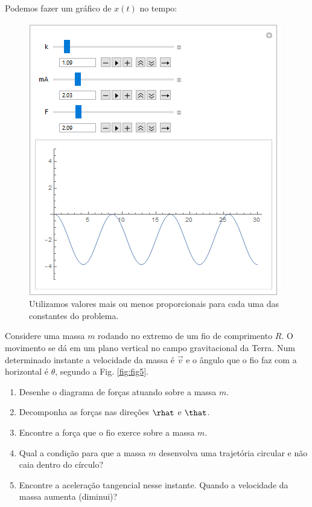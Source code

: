 \documentclass[]{IMTexam}
\begin{document}
\begin{questions}
\begin{solution}
		Podemos fazer um gráfico de $ x(t) $ no tempo:

		\begin{figure}[H]
			\centering
			\includegraphics[width=0.7\linewidth]{screenshot010}
			\caption{Utilizamos valores mais ou menos proporcionais para cada uma das constantes do problema.}
			\label{fig:screenshot010}
		\end{figure}

	\end{solution}

	\clearpage

	\question Considere uma massa $ m $ rodando no extremo de um fio de comprimento $ R $. O movimento se dá em um plano vertical no campo gravitacional da Terra. Num determinado instante a velocidade da massa é $\vec{v}$ e o ângulo que o fio faz com a horizontal é $ \theta $, segundo a Fig. \ref{fig:fig5}.

	\begin{enumerate}[label=\alph*.]
		\item Desenhe o diagrama de forças atuando sobre a massa $ m $.
		\item Decomponha as forças nas direções $\rhat $ e $\that $.
		\item Encontre a força que o fio exerce sobre a massa $ m $.
		\item Qual a condição para que a massa $ m $ desenvolva uma trajetória circular e não caia dentro do círculo?
		\item  Encontre a aceleração tangencial nesse instante. Quando a velocidade da massa aumenta (diminui)?
	\end{enumerate}


\end{questions}
\end{document}
